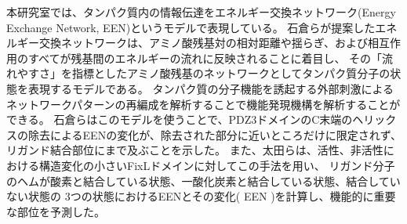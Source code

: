 本研究室では、タンパク質内の情報伝達をエネルギー交換ネットワーク(Energy Exchange Network, EEN)というモデルで表現している。
石倉らが提案したエネルギー交換ネットワークは、アミノ酸残基対の相対距離や揺らぎ、および相互作用のすべてが残基間のエネルギーの流れに反映されることに着目し、
その「流れやすさ」を指標としたアミノ酸残基のネットワークとしてタンパク質分子の状態を表現するモデルである。
タンパク質の分子機能を誘起する外部刺激によるネットワークパターンの再編成を解析することで機能発現機構を解析することができる。\autocite{ishikura_energy_2015}
石倉らはこのモデルを使うことで、PDZ3ドメインのC末端の\alpha ヘリックスの除去によるEENの変化が、除去された部分に近いところだけに限定されず、
リガンド結合部位にまで及ぶこと\autocite{ishikura_energy_2015}を示した。
また、太田らは、活性、非活性における構造変化の小さいFixLドメインに対してこの手法を用い、
リガンド分子のヘムが酸素と結合している状態、一酸化炭素と結合している状態、結合していない状態の
3つの状態におけるEENとその変化( \Delta EEN )を計算し、機能的に重要な部位を予測した。\autocite{ota_energy_2019}
